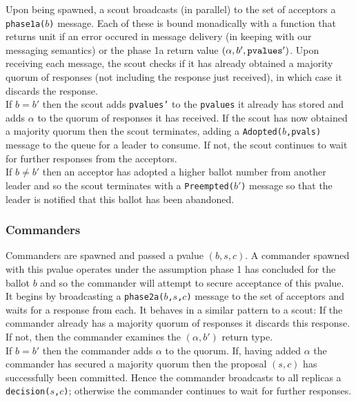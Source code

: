 Upon being spawned, a scout broadcasts (in parallel) to the set of acceptors a \texttt{phase1a($b$)} message. Each of these is bound monadically with a function that returns unit if an error occured in message delivery (in keeping with our messaging semantics) or the phase 1a return value $(\alpha, b', \textrm{\texttt{pvalues}}')$. Upon receiving each message, the scout checks if it has already obtained a majority quorum of responses (not including the response just received), in which case it discards the response. \\

If $b = b'$ then the scout adds \texttt{pvalues'} to the \texttt{pvalues} it already has stored and adds $\alpha$ to the quorum of responses it has received. If the scout has now obtained a majority quorum then the scout terminates, adding a \texttt{Adopted($b$,pvals)} message to the queue for a leader to consume. If not, the scout continues to wait for further responses from the acceptors. \\

If $b \neq b'$ then an acceptor has adopted a higher ballot number from another leader and so the scout terminates with a \texttt{Preempted($b'$)} message so that the leader is notified that this ballot has been abandoned. \\

\subsubsection{Commanders}

Commanders are spawned and passed a pvalue $\left(b, s, c \right)$. A commander spawned with this pvalue operates under the assumption phase 1 has concluded for the ballot $b$ and so the commander will attempt to secure acceptance of this pvalue. \\

It begins by broadcasting a \texttt{phase2a($b$,$s$,$c$)} message to the set of acceptors and waits for a response from each. It behaves in a similar pattern to a scout: If the commander already has a majority quorum of responses it discards this response. If not, then the commander examines the $\left(\alpha, b' \right)$ return type. \\

If $b = b'$ then the commander adds $\alpha$ to the quorum. If, having added $\alpha$ the commander has secured a majority quorum then the proposal $(s,c)$ has successfully been committed. Hence the commander broadcasts to all replicas a \texttt{decision($s$,$c$)}; otherwise the commander continues to wait for further responses. \\

